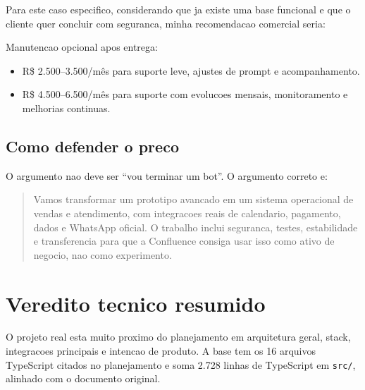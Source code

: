 \documentclass[11pt,a4paper]{article}
\begin{document}
Para este caso especifico, considerando que ja existe uma base funcional e que o cliente quer concluir com seguranca, minha recomendacao comercial seria:

\begin{center}
\end{center}

Manutencao opcional apos entrega:

\begin{itemize}
  \item R\$ 2.500--3.500/mês para suporte leve, ajustes de prompt e acompanhamento.
  \item R\$ 4.500--6.500/mês para suporte com evolucoes mensais, monitoramento e melhorias continuas.
\end{itemize}

\subsection{Como defender o preco}

O argumento nao deve ser ``vou terminar um bot''. O argumento correto e:

\begin{quote}
  Vamos transformar um prototipo avancado em um sistema operacional de vendas e atendimento, com integracoes reais de calendario, pagamento, dados e WhatsApp oficial. O trabalho inclui seguranca, testes, estabilidade e transferencia para que a Confluence consiga usar isso como ativo de negocio, nao como experimento.
\end{quote}

\section{Veredito tecnico resumido}

O projeto real esta muito proximo do planejamento em arquitetura geral, stack, integracoes principais e intencao de produto. A base tem os 16 arquivos TypeScript citados no planejamento e soma 2.728 linhas de TypeScript em \texttt{src/}, alinhado com o documento original.
\end{document}
